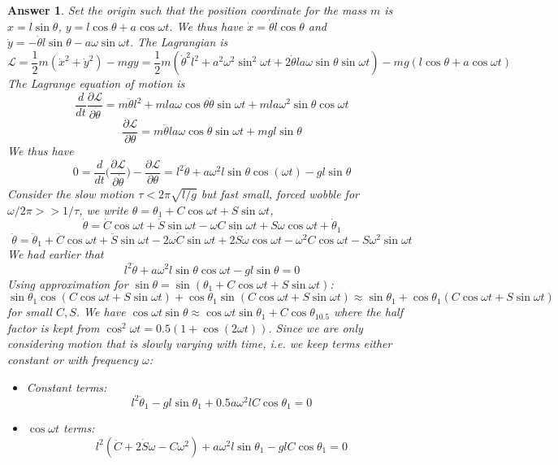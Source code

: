 \documentclass[a4paper]{article}
\newtheorem{ans}{Answer}[section]
\theoremstyle{new}
\begin{document}
\begin{ans}
Set the origin such that the position coordinate for the mass $m$ is $x=l\sin\theta$, $y=l\cos\theta+a\cos\omega t$. We thus have $\dot{x}=\dot{\theta}l\cos\theta$ and $\dot{y}=-\dot{\theta}l\sin\theta-a\omega\sin\omega t$. The Lagrangian is 
$$\mathcal{L}=\frac{1}{2}m(\dot{x}^2+\dot{y}^2)-mgy=\frac{1}{2}m(\dot{\theta}^2l^2+a^2\omega^2\sin^2\omega t+2\dot{\theta}la\omega\sin\theta\sin\omega t)-mg(l\cos\theta+a\cos\omega t)$$
The Lagrange equation of motion is
$$\frac{d}{dt}\frac{\partial\mathcal{L}}{\partial\dot{\theta}}=m\ddot{\theta}l^2+mla\omega\cos\theta\dot{\theta}\sin\omega t+mla\omega^2\sin\theta\cos\omega t $$
$$\frac{\partial\mathcal{L}}{\partial\theta}=m\dot{\theta}la\omega \cos\theta\sin\omega t+mgl\sin\theta$$
We thus have
$$0=\frac{d}{dt}\bigg(\frac{\partial\mathcal{L}}{\partial\dot{\theta}}\bigg)-\frac{\partial\mathcal{L}}{\partial\theta}=l^2\ddot{\theta}+a\omega^2l\sin\theta\cos(\omega t)-gl\sin\theta$$
Consider the slow motion $\tau<2\pi\sqrt{l/g}$ but fast small, forced wobble for $\omega/2\pi>>1/\tau$, we write $\theta=\theta_1+C\cos\omega t+S\sin\omega t$,
$$\dot{\theta}=\dot{C}\cos\omega t+\dot{S}\sin\omega t-\omega C\sin\omega t+S\omega \cos\omega t+\dot{\theta}_1$$
$$\ddot{\theta}=\ddot{\theta}_1+\ddot{C}\cos\omega t+\ddot{S}\sin\omega t-2\omega\dot{C}\sin\omega t+2\dot{S}\omega\cos\omega t-\omega^2C\cos\omega t-S\omega^2\sin\omega t$$
We had earlier that
$$l^2\ddot{\theta}+a\omega^2l\sin\theta\cos\omega t-gl\sin\theta=0$$
Using approximation for $\sin\theta=\sin(\theta_1+C\cos\omega t+S\sin\omega t)$:
$$\sin\theta_1\cos(C\cos\omega t+S\sin\omega t)+\cos\theta_1\sin(C\cos\omega t+S\sin\omega t)\approx\sin\theta_1+\cos\theta_1(C\cos\omega t+S\sin\omega t)$$
for small $C,S$. We have $\cos\omega t\sin\theta\approx\cos\omega t\sin\theta_1+C\cos\theta_10.5$ where the half factor is kept from $\cos^2\omega t=0.5(1+\cos(2\omega t))$. Since we are only considering motion that is slowly varying with time, i.e. we keep terms either constant or with frequency $\omega$:
\begin{itemize}
    \item Constant terms:
    \begin{equation}
    l^2\ddot{\theta}_1-gl\sin\theta_1+0.5a\omega^2lC\cos\theta_1=0\tag{2a}
    \end{equation}
    \item $\cos\omega t$ terms:
    \begin{equation}
    l^2(\ddot{C}+2\dot{S}\omega -C\omega^2)+a\omega^2l\sin\theta_1-glC\cos\theta_1=0\tag{2b}

\end{equation}
\end{itemize}
\end{ans}
\end{document}
